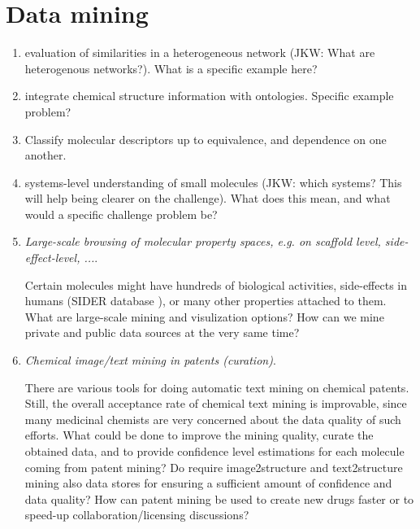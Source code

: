 \documentclass{sig-alternate}
\begin{document}
\section*{Data mining}
\begin{enumerate}
\item evaluation of similarities in a heterogeneous network (JKW: What are heterogenous networks?).  What is a specific example here?
\item integrate chemical structure information with ontologies.  Specific example problem?
\item Classify molecular descriptors up to equivalence, and dependence on one another.
\item systems-level understanding of small molecules (JKW: which systems? This will help being clearer on the challenge).  What does this mean, and what would a specific challenge problem be?
%
%
\item \emph{Large-scale browsing of molecular property spaces, e.g. on scaffold level, side-effect-level, ...}.

Certain molecules might have hundreds of biological activities, side-effects in humans (SIDER database \cite{Kuhn_Campillos_Letunic_Jensen_Bork_2010}), or
many other properties attached to them. What are large-scale mining and visulization options? 
How can we mine private and public data sources at the very same time?
%
\item \emph{Chemical image/text mining in patents (curation)}.

There are various tools for doing automatic text mining on chemical patents. Still, the overall acceptance rate of chemical
text mining is improvable, since many medicinal chemists are very concerned about the data quality of such efforts. 
What could be done to improve the mining quality, curate the obtained data, and to provide confidence level estimations 
for each molecule coming from patent mining? Do require image2structure and text2structure mining also data stores
for ensuring a sufficient amount of confidence and data quality?
How can patent mining be used to create new drugs faster or to speed-up collaboration/licensing discussions?
\end{enumerate}
\end{document}
